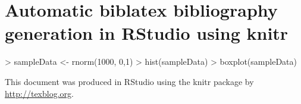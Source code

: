 \documentclass{article}
\begin{document}

 
\section*{Automatic biblatex bibliography generation in RStudio using knitr}
 
 
\begin{Schunk}
\begin{Sinput}
> sampleData <- rnorm(1000, 0,1)
> hist(sampleData)
> boxplot(sampleData)
\end{Sinput}
\end{Schunk}
 
This document was produced in RStudio using the knitr package \cite{knitr2013} by \url{http://texblog.org}.
 
\printbibliography
 
\end{document}
